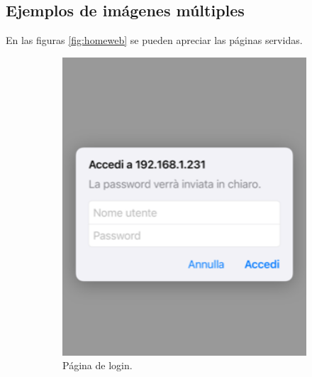 \subsection{Ejemplos de imágenes múltiples}

En las figuras \ref{fig:homeweb} se pueden apreciar las páginas servidas.

\begin{figure}[!htpb]
     \centering
     \begin{subfigure}[b]{0.3\textwidth}
         \centering
         \includegraphics[width=1\textwidth]{./Figures/loginWeb.png}
         \caption{Página de login.}
         \label{fig:loginWeb}
     \end{subfigure}
     \hfill
     \begin{subfigure}[b]{0.3\textwidth}
         \centering

\end{subfigure}
\end{figure}
